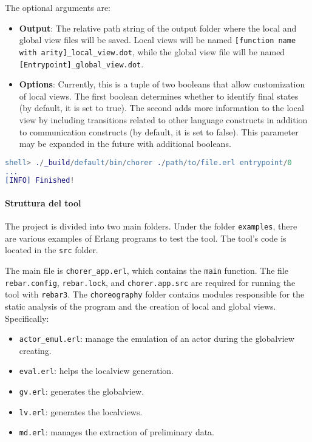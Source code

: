 \noindent The optional arguments are:
\begin{itemize}
    \item \textbf{Output}: The relative path string of the output folder where the local and global view files will be saved. Local views will be named \texttt{[function name with arity]\_local\_view.dot}, while the global view file will be named \texttt{[Entrypoint]\_global\_view.dot}.
    \item \textbf{Options}: Currently, this is a tuple of two booleans that allow customization of local views. The first boolean determines whether to identify final states (by default, it is set to true). The second adds more information to the local view by including transitions related to other language constructs in addition to communication constructs (by default, it is set to false). This parameter may be expanded in the future with additional booleans.
\end{itemize}

\begin{lstlisting}[language=Erlang, caption=Use example of the tool]
shell> ./_build/default/bin/chorer ./path/to/file.erl entrypoint/0
...
[INFO] Finished!
\end{lstlisting}

\paragraph{Struttura del tool}
The project is divided into two main folders. Under the folder \texttt{examples},
there are various examples of Erlang programs to test the tool. The tool's code
is located in the \texttt{src} folder.

\bigskip


\bigskip

The main file is \texttt{chorer\_app.erl}, which contains the \texttt{main} function.  
The file \texttt{rebar.config}, \texttt{rebar.lock}, and \texttt{chorer.app.src} are required for running the tool with \texttt{rebar3}.  
The \texttt{choreography} folder contains modules responsible for the static analysis of the program and the creation of local and global views. Specifically:  
\begin{itemize}  
    \item \texttt{actor\_emul.erl}: manage the emulation of an actor during the globalview creating.
    \item \texttt{eval.erl}: helps the localview generation.  
    \item \texttt{gv.erl}: generates the globalview.  
    \item \texttt{lv.erl}: generates the localviews.  
    \item \texttt{md.erl}: manages the extraction of preliminary data.  
  \end{itemize}  

